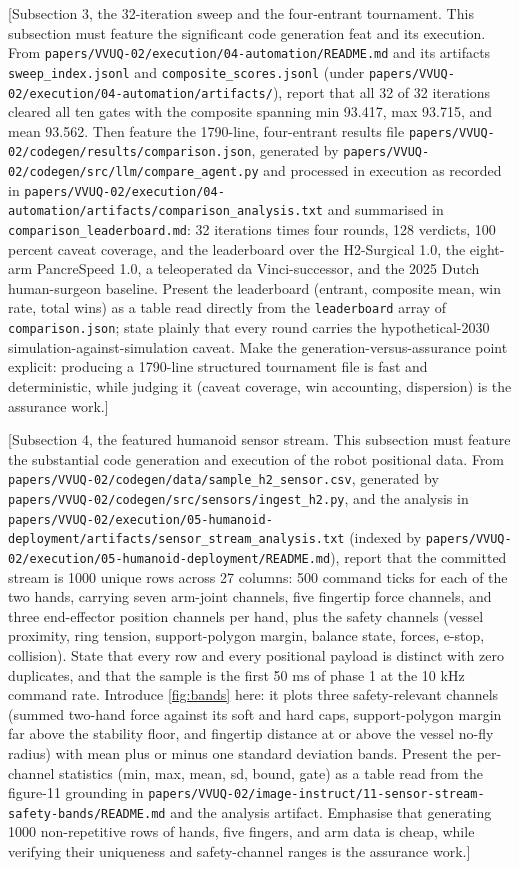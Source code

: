 [Subsection 3, the 32-iteration sweep and the four-entrant tournament. This
subsection must feature the significant code generation feat and its execution.
From \texttt{papers/VVUQ-02/execution/04-automation/README.md} and its artifacts
\texttt{sweep\_index.jsonl} and \texttt{composite\_scores.jsonl} (under
\texttt{papers/VVUQ-02/execution/04-automation/artifacts/}), report that all 32 of
32 iterations cleared all ten gates with the composite spanning min 93.417, max
93.715, and mean 93.562. Then feature the 1790-line, four-entrant results file
\texttt{papers/VVUQ-02/codegen/results/comparison.json}, generated by
\texttt{papers/VVUQ-02/codegen/src/llm/compare\_agent.py} and processed in
execution as recorded in
\texttt{papers/VVUQ-02/execution/04-automation/artifacts/comparison\_analysis.txt}
and summarised in \texttt{comparison\_leaderboard.md}: 32 iterations times four
rounds, 128 verdicts, 100 percent caveat coverage, and the leaderboard over the
H2-Surgical 1.0, the eight-arm PancreSpeed 1.0, a teleoperated da Vinci-successor,
and the 2025 Dutch human-surgeon baseline. Present the leaderboard (entrant,
composite mean, win rate, total wins) as a table read directly from the
\texttt{leaderboard} array of \texttt{comparison.json}; state plainly that every
round carries the hypothetical-2030 simulation-against-simulation caveat. Make the
generation-versus-assurance point explicit: producing a 1790-line structured
tournament file is fast and deterministic, while judging it (caveat coverage, win
accounting, dispersion) is the assurance work.]

[Subsection 4, the featured humanoid sensor stream. This subsection must feature
the substantial code generation and execution of the robot positional data. From
\texttt{papers/VVUQ-02/codegen/data/sample\_h2\_sensor.csv}, generated by
\texttt{papers/VVUQ-02/codegen/src/sensors/ingest\_h2.py}, and the analysis in
\texttt{papers/VVUQ-02/execution/05-humanoid-deployment/artifacts/sensor\_stream\_analysis.txt}
(indexed by \texttt{papers/VVUQ-02/execution/05-humanoid-deployment/README.md}),
report that the committed stream is 1000 unique rows across 27 columns: 500 command
ticks for each of the two hands, carrying seven arm-joint channels, five fingertip
force channels, and three end-effector position channels per hand, plus the safety
channels (vessel proximity, ring tension, support-polygon margin, balance state,
forces, e-stop, collision). State that every row and every positional payload is
distinct with zero duplicates, and that the sample is the first 50 ms of phase 1 at
the 10 kHz command rate. Introduce \autoref{fig:bands} here: it plots three
safety-relevant channels (summed two-hand force against its soft and hard caps,
support-polygon margin far above the stability floor, and fingertip distance at or
above the vessel no-fly radius) with mean plus or minus one standard deviation
bands. Present the per-channel statistics (min, max, mean, sd, bound, gate) as a
table read from the figure-11 grounding in
\texttt{papers/VVUQ-02/image-instruct/11-sensor-stream-safety-bands/README.md} and
the analysis artifact. Emphasise that generating 1000 non-repetitive rows of
hands, five fingers, and arm data is cheap, while verifying their uniqueness and
safety-channel ranges is the assurance work.]

